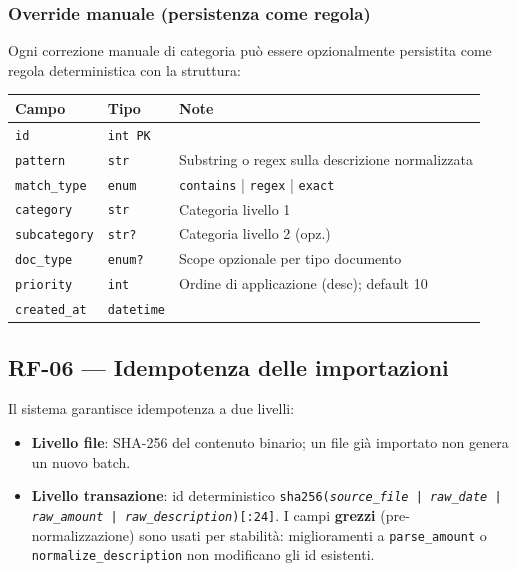 \documentclass[11pt, a4paper]{article}
\begin{document}
\subsubsection{Override manuale (persistenza come regola)}

Ogni correzione manuale di categoria può essere opzionalmente persistita come regola
deterministica con la struttura:

\begin{center}
\begin{tabular}{@{}L{4cm} L{3.5cm} L{5.5cm}@{}}
\toprule
\textbf{Campo} & \textbf{Tipo} & \textbf{Note} \\
\midrule
\texttt{id}           & \texttt{int PK}    & \\
\texttt{pattern}      & \texttt{str}       & Substring o regex sulla descrizione normalizzata \\
\texttt{match\_type}  & \texttt{enum}      & \texttt{contains} | \texttt{regex} | \texttt{exact} \\
\texttt{category}     & \texttt{str}       & Categoria livello 1 \\
\texttt{subcategory}  & \texttt{str?}      & Categoria livello 2 (opz.) \\
\texttt{doc\_type}    & \texttt{enum?}     & Scope opzionale per tipo documento \\
\texttt{priority}     & \texttt{int}       & Ordine di applicazione (desc); default 10 \\
\texttt{created\_at}  & \texttt{datetime}  & \\
\bottomrule
\end{tabular}
\end{center}

\subsection{RF-06 --- Idempotenza delle importazioni}

Il sistema garantisce idempotenza a due livelli:

\begin{itemize}[leftmargin=2em]
  \item \textbf{Livello file}: SHA-256 del contenuto binario; un file già importato non
        genera un nuovo batch.
  \item \textbf{Livello transazione}: id deterministico
        \texttt{sha256(\textit{source\_file} | \textit{raw\_date} | \textit{raw\_amount}
        | \textit{raw\_description})[:24]}.
        I campi \textbf{grezzi} (pre-normalizzazione) sono usati per stabilità:
        miglioramenti a \texttt{parse\_amount} o \texttt{normalize\_description} non
        modificano gli id esistenti.
\end{itemize}
\end{document}
